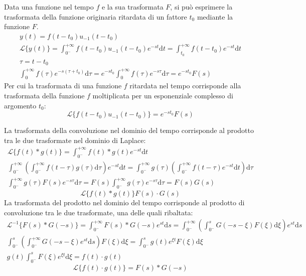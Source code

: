 \documentclass{article}
\newcommand{\df}{\mathrm{d}}
\numberwithin{equation}{subsection}
\begin{document}
Data una funzione nel tempo $f$ e la sua trasformata $F$, si può esprimere la trasformata della funzione originaria ritardata di un fattore $t_0$ mediante 
la funzione $F$. 
\begin{gather*}
    y(t)=f(t-t_0)u_{-1}(t-t_0)\\
    \mathcal{L}\{y(t)\}=\displaystyle\int_{0^-}^{+\infty}f(t-t_0)u_{-1}(t-t_0)e^{-st}\df t=\int_{t_0}^{+\infty}f(t-t_0)e^{-st}\df t\\
    \tau=t-t_0\\
    \displaystyle\int_{0}^{+\infty}f(\tau)e^{-s(\tau+t_0)}\df\tau=e^{-st_0}\int_0^{+\infty}f(\tau)e^{-s\tau}\df\tau=e^{-st_0}F(s)
\end{gather*}
Per cui la trasformata di una funzione $f$ ritardata nel tempo corrisponde alla trasformata della funzione $f$ moltiplicata per un esponenziale complesso di argomento $t_0$:
\begin{equation}
    \mathcal{L}\{f(t-t_0)u_{-1}(t-t_0)\}=e^{-st_0}F(s)
\end{equation}


La trasformata della convoluzione nel dominio del tempo corrisponde al prodotto tra le due trasformate nel dominio di Laplace:
\begin{gather*}
    \mathcal{L}\{f(t)* g(t)\}=\displaystyle\int_{0^-}^{+\infty}f(t)*g(t)e^{-st}\df t\\
    \displaystyle\int_{0^-}^{+\infty}\left(\int_{0^-}^{+\infty}f(t-\tau)g(\tau)\df\tau\right)e^{-st}\df t=\int_{0^-}^{+\infty}g(\tau)\left(\int_{0^-}^{+\infty}f(t-\tau)e^{-st}\df t\right)\df\tau\\
    \displaystyle\int_{0^-}^{+\infty}g(\tau)F(s)e^{-s\tau}\df\tau=F(s)\int_{0^-}^{+\infty}g(\tau)e^{-s\tau}\df\tau=F(s)G(s)
\end{gather*}
\begin{equation}
    \mathcal{L}\{f(t)*g(t)\}F(s)\cdot G(s)
\end{equation}
La trasformata del prodotto nel dominio del tempo corrisponde al prodotto di convoluzione tra le due trasformate, una delle quali ribaltata:
\begin{gather*}
    \mathcal{L}^{-1}\{F(s)*G(-s)\}=\displaystyle\int_{0^-}^{+\infty}F(s)*G(-s)e^{st}\df s=\int_{0^-}^{+\infty}\left(\int_{0^-}^sG(-s-\xi)F(\xi)\df\xi\right)e^{st}\df s\\
    \displaystyle\int_{0^-}^{s}\left(\int_{0^-}^{+\infty}G(-s-\xi)e^{st}\df s\right)F(\xi)\df\xi=\int_{0^-}^sg(t)e^{\xi t}F(\xi)\df\xi\\
    g(t)\displaystyle\int_{0^-}^{s}F(\xi)e^{\xi t}\df\xi=f(t)\cdot g(t)
\end{gather*}
\begin{equation}
    \mathcal{L}\{f(t)\cdot g(t)\}=F(s)*G(-s)
\end{equation}
\end{document}
